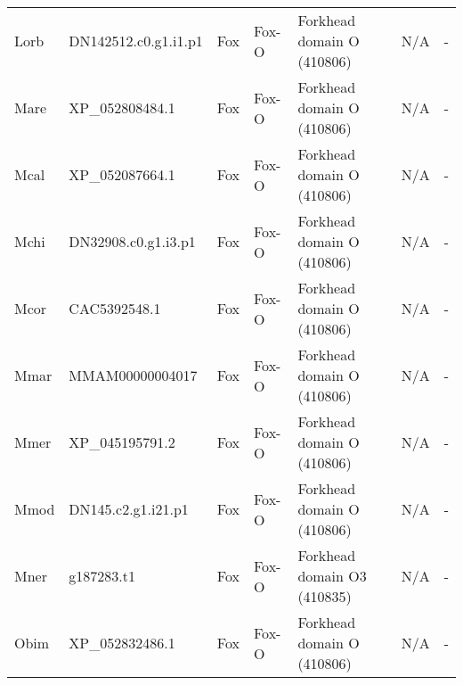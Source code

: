 \documentclass[../main.tex]{subfiles}
\begin{document}
\begin{landscape}
\begin{longtable}{lllllll}
		Lorb           & DN142512.c0.g1.i1.p1  & Fox            & Fox-O               & Forkhead domain O (410806)                  & N/A                                                                    & -                    \\
		Mare           & XP\_052808484.1       & Fox            & Fox-O               & Forkhead domain O (410806)                  & N/A                                                                    & -                    \\
		Mcal           & XP\_052087664.1       & Fox            & Fox-O               & Forkhead domain O (410806)                  & N/A                                                                    & -                    \\
		Mchi           & DN32908.c0.g1.i3.p1   & Fox            & Fox-O               & Forkhead domain O (410806)                  & N/A                                                                    & -                    \\
		Mcor           & CAC5392548.1          & Fox            & Fox-O               & Forkhead domain O (410806)                  & N/A                                                                    & -                    \\
		Mmar           & MMAM00000004017       & Fox            & Fox-O               & Forkhead domain O (410806)                  & N/A                                                                    & -                    \\
		Mmer           & XP\_045195791.2       & Fox            & Fox-O               & Forkhead domain O (410806)                  & N/A                                                                    & -                    \\
		Mmod           & DN145.c2.g1.i21.p1    & Fox            & Fox-O               & Forkhead domain O (410806)                  & N/A                                                                    & -                    \\
		Mner           & g187283.t1            & Fox            & Fox-O               & Forkhead domain O3 (410835)                 & N/A                                                                    & -                    \\
		Obim           & XP\_052832486.1       & Fox            & Fox-O               & Forkhead domain O (410806)                  & N/A                                                                    & -                    \\

\end{longtable}
\end{landscape}
\end{document}
